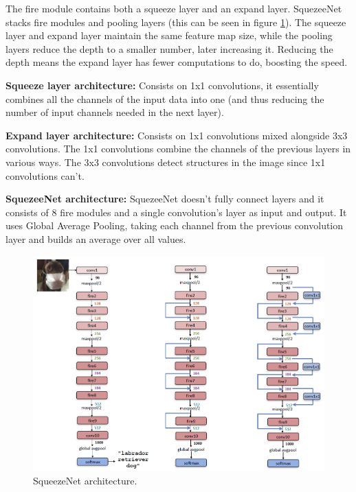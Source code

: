     The fire module contains both a squeeze layer and an expand layer. SquezeeNet stacks fire modules and pooling layers  (this can be seen in figure \ref{fig:squezeenet}). The squeeze layer and expand layer maintain the same feature map size, while the pooling layers reduce the depth to a smaller number, later increasing it. Reducing the depth means the expand layer has fewer computations to do, boosting the speed.\par


    \hfill
    
   \textbf{Squeeze layer architecture: } Consists on 1x1 convolutions, it essentially combines all the channels of the input data into one (and thus reducing the number of input channels needed in the next layer).\par
   \hfill

   \textbf{Expand layer architecture:} Consists on 1x1 convolutions mixed alongside 3x3 convolutions. The 1x1 convolutions combine the channels of the previous layers in various ways. The 3x3 convolutions detect structures in the image since 1x1 convolutions can’t. \par
   \hfill

   \textbf{SquezeeNet architecture:} SquezeeNet doesn’t fully connect layers and it consists of 8 fire modules and a single convolution's layer as input and output. It uses Global Average Pooling, taking each channel from the previous convolution layer and builds an average over all values.



   \begin{figure}[htb]
    \centering
    \includegraphics[scale = 0.3]{Sections/2StateOfTheArt/2_images/squezeeNetArchitecture.png}
    \caption{SqueezeNet architecture. \cite{squeezenetweb}} 
    \label{fig:squezeenet}
\end{figure}


